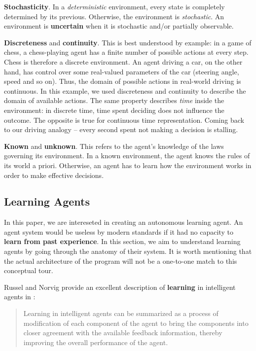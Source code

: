 \textbf{Stochasticity}.
In a \emph{deterministic} environment, every state is completely determined by its previous. Otherwise, the environment is \emph{stochastic}. An environment is \textbf{uncertain} when it is stochastic and/or partially observable.

\textbf{Discreteness} and \textbf{continuity}.
This is best understood by example:
in a game of chess, a chess-playing agent has a finite number of possible actions at every step.
Chess is therefore a discrete environment.
An agent driving a car, on the other hand, has control over some real-valued parameters of the car (steering angle, speed and so on).
Thus, the domain of possible actions in real-world driving is continuous.
In this example, we used discreteness and continuity to describe the domain of available actions.
The same property describes \emph{time} inside the environment: in discrete time, time spent deciding does not influence the outcome. The opposite is true for continuous time representation. Coming back to our driving analogy -- every second spent not making a decision is stalling.

\textbf{Known} and \textbf{unknown}.
This refers to the agent's knowledge of the laws governing its environment. In a known environment, the agent knows the rules of its world a priori. Otherwise, an agent has to learn how the environment works in order to make effective decisions.


\subsection{Learning Agents} \label{learning-agents}
In this paper, we are intereseted in creating an autonomous learning agent.
An agent system would be useless by modern standards if it had no capacity to \textbf{learn from past experience}.
In this section, we aim to understand learning agents by going through the anatomy of their system.
It is worth mentioning that the actual architecture of the program will not be a one-to-one match to this conceptual tour.

Russel and Norvig provide an excellent description of \textbf{learning} in intelligent agents in \cite{aima}:
\begin{quote}
    Learning in intelligent agents can be summarized as a process of modification of each component of the agent to bring the components into closer agreement with the available feedback information, thereby improving the overall performance of the agent.
\end{quote}

